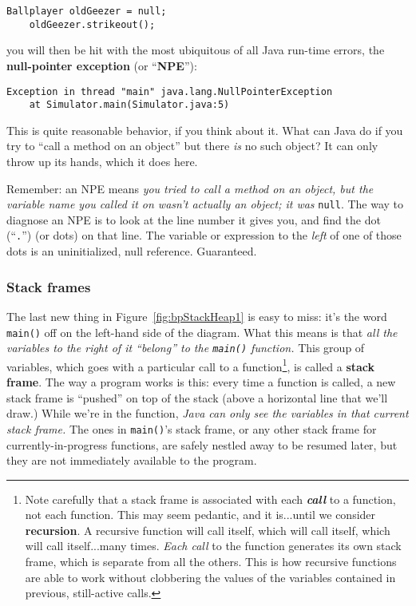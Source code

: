 \begin{Verbatim}[fontsize=\small,samepage=true]
    Ballplayer oldGeezer = null;
    oldGeezer.strikeout();
\end{Verbatim}

you will then be hit with the most ubiquitous of all Java
run-time errors, the \textbf{null-pointer exception} (or ``\textbf{NPE}''):

\begin{Verbatim}[fontsize=\small,samepage=true]
Exception in thread "main" java.lang.NullPointerException
    at Simulator.main(Simulator.java:5)
\end{Verbatim}

This is quite reasonable behavior, if you think about it. What can Java do if
you try to ``call a method on an object'' but there \textit{is} no such object?
It can only throw up its hands, which it does here.

Remember: an NPE means \textit{you tried to call a method on an object, but
the variable name you called it on wasn't actually an object; it was}
\texttt{null}. The way to diagnose an NPE is to look at the line number it
gives you, and find the dot (``\texttt{.}'') (or dots) on that line. The
variable or expression to the \textit{left} of one of those dots is an
uninitialized, null reference. Guaranteed.

\subsubsection{Stack frames}

The last new thing in Figure~\ref{fig:bpStackHeap1} is easy to miss: it's the
word \texttt{main()} off on the left-hand side of the diagram. What this means
is that \textit{all the variables to the right of it ``belong'' to the
\texttt{main()} function.} This group of variables, which goes with a
particular call to a function\footnote{Note carefully that a stack frame is
associated with each \textbf{\textit{call}} to a function, not each function.
This may seem pedantic, and it is...until we consider \textbf{recursion}. A
recursive function will call itself, which will call itself, which will call
itself...many times. \textit{Each call} to the function generates its own
stack frame, which is separate from all the others. This is how recursive
functions are able to work without clobbering the values of the variables
contained in previous, still-active calls.}, is called a \textbf{stack frame}.
The way a program works is this: every time a function is called, a new stack
frame is ``pushed'' on top of the stack (above a horizontal line that we'll
draw.) While we're in the function, \textit{Java can only see the variables in
that current stack frame.} The ones in \texttt{main()}'s stack frame, or any
other stack frame for currently-in-progress functions, are safely nestled away
to be resumed later, but they are not immediately available to the program.

